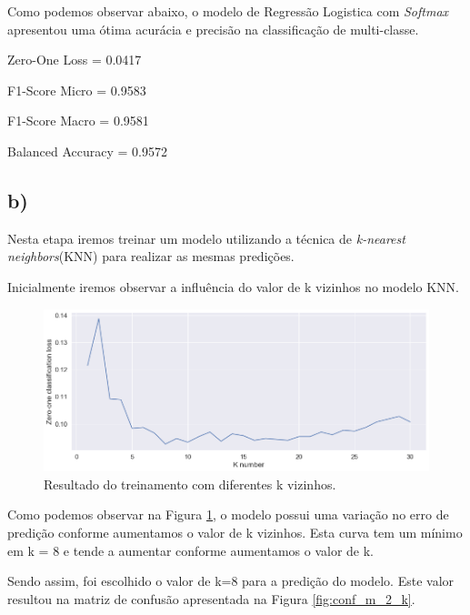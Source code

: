 \documentclass[12pt]{article}
\begin{document}
Como podemos observar abaixo, o modelo de Regressão Logistica com \textit{Softmax} apresentou uma ótima acurácia e precisão na classificação de multi-classe. 

\begin{center}
	Zero-One Loss = 0.0417
	
	F1-Score Micro = 0.9583
	
	F1-Score Macro = 0.9581
	
	Balanced Accuracy = 0.9572
\end{center}

\subsection*{b)}

Nesta etapa iremos treinar um modelo utilizando a técnica de \textit{k-nearest neighbors}(KNN) para realizar as mesmas predições.

Inicialmente iremos observar a influência do valor de k vizinhos no modelo KNN.

\begin{figure}[H]
	\centering
	\includegraphics[width=\linewidth]{images/k_values.png}
	\caption{Resultado do treinamento com diferentes k vizinhos.}
	\label{fig:k_values}
\end{figure}

Como podemos observar na Figura \ref{fig:k_values}, o modelo possui uma variação no erro de predição conforme aumentamos o valor de k vizinhos. Esta curva tem um mínimo em k = 8 e tende a aumentar conforme aumentamos o valor de k.

Sendo assim, foi escolhido o valor de k=8 para a predição do modelo. Este valor resultou na matriz de confusão apresentada na Figura \ref{fig:conf_m_2_k}.
\end{document}
